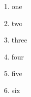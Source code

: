 \documentclass[11pt]{article}
\begin{document}
\begin{enumerate}[label=(\alph*)]

  \item one

  \item two

  \item three

  \item four

  \item five

  \item six

\end{enumerate}


\end{document}
